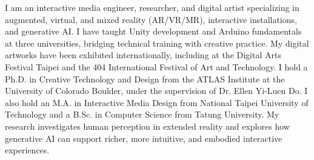 
I am an interactive media engineer, researcher, and digital artist specializing in augmented, virtual, and mixed reality (AR/VR/MR), interactive installations, and generative AI. I have taught Unity development and Arduino fundamentals at three universities, bridging technical training with creative practice. My digital artworks have been exhibited internationally, including at the Digital Arts Festival Taipei and the 404 International Festival of Art and Technology. I hold a Ph.D. in Creative Technology and Design from the ATLAS Institute at the University of Colorado Boulder, under the supervision of Dr. Ellen Yi-Luen Do. I also hold an M.A. in Interactive Media Design from National Taipei University of Technology and a B.Sc. in Computer Science from Tatung University. My research investigates human perception in extended reality and explores how generative AI can support richer, more intuitive, and embodied interactive experiences.

